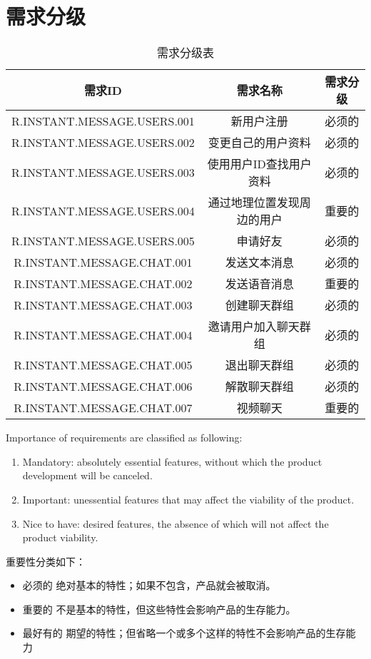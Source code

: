 \chapter{需求分级}
\begin{table}[htbp]
\centering
\caption{需求分级表} \label{tab:classification}
\begin{tabular}{|c|c|c|}
    \hline
    需求ID & 需求名称 & 需求分级 \\
    \hline
    R.INSTANT.MESSAGE.USERS.001 & 新用户注册 & 必须的 \\
    \hline
    R.INSTANT.MESSAGE.USERS.002 & 变更自己的用户资料 & 必须的 \\
    \hline
    R.INSTANT.MESSAGE.USERS.003 & 使用用户ID查找用户资料 & 必须的 \\
    \hline
    R.INSTANT.MESSAGE.USERS.004 & 通过地理位置发现周边的用户 & 重要的 \\
    \hline
    R.INSTANT.MESSAGE.USERS.005 & 申请好友 & 必须的 \\
    \hline
    R.INSTANT.MESSAGE.CHAT.001 & 发送文本消息 & 必须的 \\
    \hline
    R.INSTANT.MESSAGE.CHAT.002 & 发送语音消息 & 重要的 \\
    \hline
    R.INSTANT.MESSAGE.CHAT.003 & 创建聊天群组 & 必须的 \\
    \hline
    R.INSTANT.MESSAGE.CHAT.004 & 邀请用户加入聊天群组 & 必须的 \\
    \hline
    R.INSTANT.MESSAGE.CHAT.005 & 退出聊天群组 & 必须的 \\
    \hline
    R.INSTANT.MESSAGE.CHAT.006 & 解散聊天群组 & 必须的 \\
    \hline
    R.INSTANT.MESSAGE.CHAT.007 & 视频聊天 & 重要的 \\
    \hline
\end{tabular}
\end{table}

Importance of requirements are classified as following:
\begin{enumerate}
\item Mandatory: absolutely essential features, without which the product development will be canceled.
\item Important: unessential features that may affect the viability of the product.
\item Nice to have: desired features, the absence of which will not affect the product viability.
\end{enumerate}

重要性分类如下：
\begin{itemize}
\item 必须的		绝对基本的特性；如果不包含，产品就会被取消。
\item 重要的		不是基本的特性，但这些特性会影响产品的生存能力。
\item 最好有的		期望的特性；但省略一个或多个这样的特性不会影响产品的生存能力
\end{itemize}
